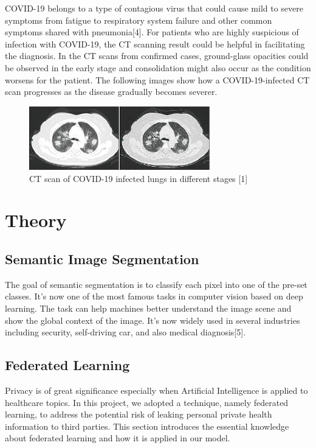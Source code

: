 \documentclass[12pt]{spie}
\begin{document}
COVID-19 belongs to a type of contagious virus that could cause mild to severe symptoms from fatigue to respiratory system failure and other common symptoms shared with pneumonia[4]. For patients who are highly suspicious of infection with COVID-19, the CT scanning result could be helpful in facilitating the diagnosis. In the CT scans from confirmed cases, ground-glass opacities could be observed in the early stage and consolidation might also occur as the condition worsens for the patient. The following images show how a COVID-19-infected CT scan progresses as the disease gradually becomes severer.
\begin{figure}[H]
  \centering
  \includegraphics[width=0.7\textwidth]{scan.png} 
   \caption{CT scan of COVID-19 infected lungs in different 
   stages [1]}
   
\end{figure}

\section{Theory}
\subsection{Semantic Image Segmentation}
The goal of semantic segmentation is to classify each pixel into one of the pre-set classes. It's now one of the most famous tasks in computer vision based on deep learning. The task can help machines better understand the image scene and show the global context of the image. It's now widely used in several industries including security, self-driving car, and also medical diagnosis[5].

\subsection{Federated Learning}
Privacy is of great significance especially when Artificial Intelligence is applied to healthcare topics. In this project, we adopted a technique, namely federated learning, to address the potential risk of leaking personal private health information to third parties. This section introduces the essential knowledge about federated learning and how it is applied in our model.
\end{document}
